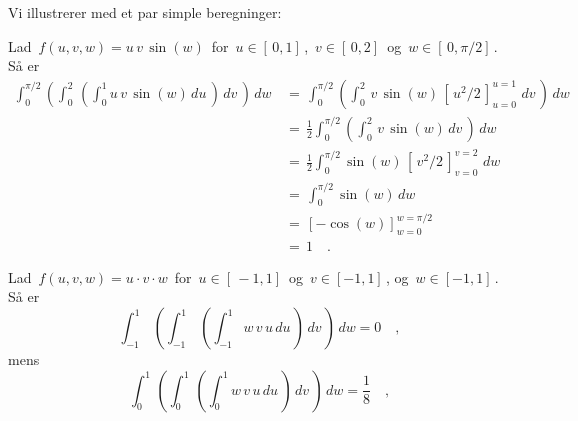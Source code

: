 Vi illustrerer med et par simple beregninger:

\begin{example} \label{exDobbeltInt3}
Lad $\,f(u,v,w) = u\,v\,\sin(w)\,$ for $\,u \in [\,0,1]\,$,  $\, v \in [\,0, 2]\,$ og $\, w \in [\,0, \pi/2]\,$. Så er
\begin{equation*}
\begin{aligned}
\int_{0}^{\pi/2}\left(\int_{0}^{2}\, \left(
\int_{0}^{1} u\,v \, \sin(w)\, du \, \right)\, dv\, \right)\, dw \, &= \,
\int_{0}^{\pi/2}\left(\int_{0}^{2}\,
 v \, \sin(w) \,[\,u^{2}/2\,]_{u=0}^{u=1}\,\, dv\, \right)\, dw \\ &= \,
\frac{1}{2}\int_{0}^{\pi/2}\left(\int_{0}^{2}\,
 v \, \sin(w)\, dv\, \right)\, dw \\ &= \,
\frac{1}{2}\int_{0}^{\pi/2}
\sin(w)\,[\,v^{2}/2 \,]_{v=0}^{v=2}\,\, dw \\ &= \,
\int_{0}^{\pi/2}
\sin(w)\, dw \\ &= \,
[-\cos(w)]_{w=0}^{w=\pi/2} \\ &= \,
1 \quad .
\end{aligned}
\end{equation*}
\end{example}



\begin{example} \label{exampTreDobbeltIntUVW}
Lad $\,f(u,v,w) = u\cdot v\cdot w \,$ for $\,u \in [\,-1,1]\,$ og $\, v \in [-1, 1]\,$, og $\, w \in [-1, 1]\,$. Så er
\begin{equation}
\int_{-1}^{1}\, \left(\int_{-1}^{1}\, \left(
\int_{-1}^{1} w\,v\,u \, du \, \right)\, dv \, \right) \, dw =  0 \quad ,
\end{equation}
mens
\begin{equation}
\int_{0}^{1}\, \left(\int_{0}^{1}\, \left(
\int_{0}^{1} w\,v\,u \, du \, \right)\, dv \, \right) \, dw =  \frac{1}{8} \quad ,
\end{equation}
\end{example}





